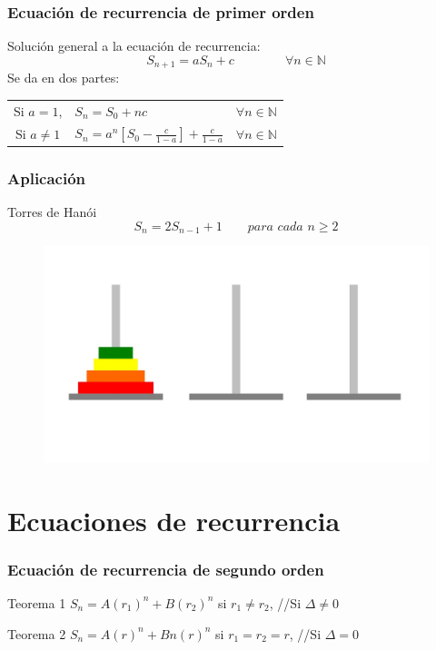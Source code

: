 \begin{frame}
	\frametitle{Ecuación de recurrencia de primer orden}
	\begin{block}{}
		Solución general a la ecuación de recurrencia:
		$$S_{n+1} = aS_n + c \qquad \qquad \forall n \in \mathds{N}$$
		Se da en dos partes:
		\begin{tabular}{cll}
			Si $a=1$, & $S_n = S_0 + nc$ & $\forall n \in \mathds{N}$\\
			Si $a\neq 1$& $S_n = a^n [S_0 - \frac{c}{1-a}] + \frac{c}{1-a}$  &$\forall n \in \mathds{N} $
		\end{tabular}
	\end{block}
\end{frame}

\begin{frame}
	\frametitle{Aplicación}
	\begin{block}{Torres de Hanói}
		$$S_n = 2S_{n-1} + 1   \qquad \textit{para cada $n \geq 2$}$$
	\end{block}
	
	\begin{block}{}
		\begin{figure}
			\centering
			\includegraphics[scale=0.15]{torre.jpg}
		\end{figure}
	\end{block}
\end{frame}

\section{Ecuaciones de recurrencia}

\begin{frame}
	\frametitle{Ecuación de recurrencia de segundo orden}
	\begin{block}{Teorema 1}
		$S_n = A(r_1)^n + B(r_2)^n$ si $r_1 \neq r_2$, \;\;\;\;\;\;\;\;\;\;\; //Si $\Delta \neq 0$
		
	\end{block}
	\begin{block}{Teorema 2}
		$S_n = A(r)^n + Bn(r)^n$ si $r_1 = r_2 = r$, \;\;\;\;\;\;\;\;\;\;\; //Si $\Delta = 0$
		
	\end{block}
\end{frame}



